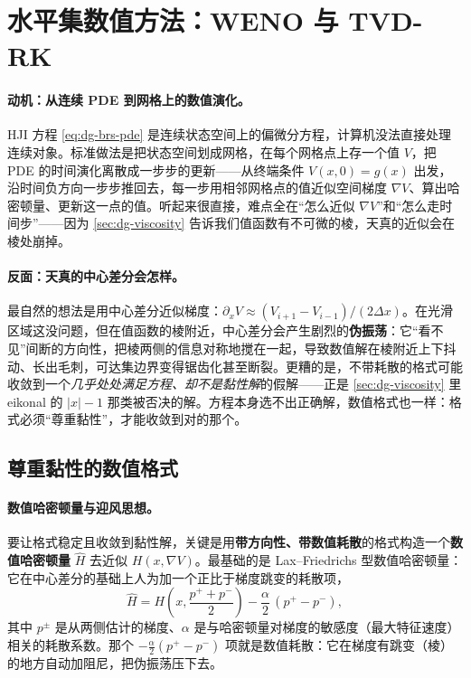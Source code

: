 \section{水平集数值方法：WENO 与 TVD-RK}
\label{sec:dg-numerics}

\paragraph{动机：从连续 PDE 到网格上的数值演化。}
HJI 方程 \cref{eq:dg-brs-pde} 是连续状态空间上的偏微分方程，计算机没法直接处理连续对象。标准做法是把状态空间划成网格，在每个网格点上存一个值 $V$，把 PDE 的时间演化离散成一步步的更新——从终端条件 $V(x,0)=g(x)$ 出发，沿时间负方向一步步推回去，每一步用相邻网格点的值近似空间梯度 $\nabla V$、算出哈密顿量、更新这一点的值。听起来很直接，难点全在“怎么近似 $\nabla V$”和“怎么走时间步”——因为 \cref{sec:dg-viscosity} 告诉我们值函数有不可微的棱，天真的近似会在棱处崩掉。

\paragraph{反面：天真的中心差分会怎样。}
最自然的想法是用中心差分近似梯度：$\partial_x V\approx(V_{i+1}-V_{i-1})/(2\Delta x)$。在光滑区域这没问题，但在值函数的棱附近，中心差分会产生剧烈的\textbf{伪振荡}：它“看不见”间断的方向性，把棱两侧的信息对称地搅在一起，导致数值解在棱附近上下抖动、长出毛刺，可达集边界变得锯齿化甚至断裂。更糟的是，不带耗散的格式可能收敛到一个\emph{几乎处处满足方程、却不是黏性解}的假解——正是 \cref{sec:dg-viscosity} 里 eikonal 的 $|x|-1$ 那类被否决的解。方程本身选不出正确解，数值格式也一样：格式必须“尊重黏性”，才能收敛到对的那个。

\subsection{尊重黏性的数值格式}
\label{sec:dg-scheme}
\paragraph{数值哈密顿量与迎风思想。}
要让格式稳定且收敛到黏性解，关键是用\textbf{带方向性、带数值耗散}的格式构造一个\textbf{数值哈密顿量} $\hat H$ 去近似 $H(x,\nabla V)$。最基础的是 Lax--Friedrichs 型数值哈密顿量：它在中心差分的基础上人为加一个正比于梯度跳变的耗散项，
\begin{equation}
  \hat H=H\!\left(x,\frac{p^++p^-}{2}\right)-\frac{\alpha}{2}\,(p^+-p^-),
  \label{eq:dg-lf}
\end{equation}
其中 $p^\pm$ 是从两侧估计的梯度、$\alpha$ 是与哈密顿量对梯度的敏感度（最大特征速度）相关的耗散系数。那个 $-\tfrac{\alpha}{2}(p^+-p^-)$ 项就是数值耗散：它在梯度有跳变（棱）的地方自动加阻尼，把伪振荡压下去。


